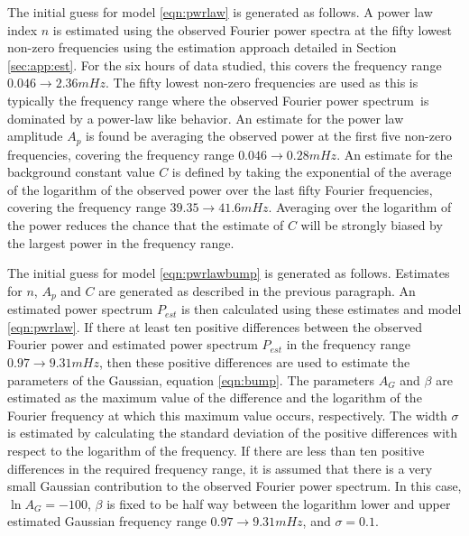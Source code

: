 \documentclass[onecolumn]{emulateapj}
\newcommand{\PS}{power spectrum}
\newcommand{\Fps}{Fourier \PS}
\begin{document}
The initial guess for model \ref{eqn:pwrlaw} is generated as follows.
A power law index $n$ is estimated using the observed Fourier power
spectra at the fifty lowest non-zero frequencies using the estimation
approach detailed in Section \ref{sec:app:est}.  For the six hours of
data studied, this covers the frequency range $0.046\rightarrow2.36
mHz$.  The fifty lowest non-zero frequencies are used as this is
typically the frequency range where the observed \Fps\ is dominated by
a power-law like behavior.  An estimate for the power law amplitude
$A_{p}$ is found be averaging the observed power at the first five
non-zero frequencies, covering the frequency range
$0.046\rightarrow0.28 mHz$.  An estimate for the background constant
value $C$ is defined by taking the exponential of the average of the
logarithm of the observed power over the last fifty Fourier
frequencies, covering the frequency range $39.35\rightarrow41.6 mHz$.
Averaging over the logarithm of the power reduces the chance that the
estimate of $C$ will be strongly biased by the largest power in the
frequency range.

The initial guess for model \ref{eqn:pwrlawbump} is generated as
follows.  Estimates for $n$, $A_{p}$ and $C$ are generated as
described in the previous paragraph.  An estimated power spectrum
$P_{est}$ is then calculated using these estimates and model
\ref{eqn:pwrlaw}.  If there at least ten positive differences between
the observed Fourier power and estimated power spectrum $P_{est}$ in
the frequency range $0.97 \rightarrow 9.31 mHz$, then these positive
differences are used to estimate the parameters of the Gaussian,
equation \ref{eqn:bump}.  The parameters $A_{G}$ and $\beta$ are
estimated as the maximum value of the difference and the logarithm of
the Fourier frequency at which this maximum value occurs,
respectively.  The width $\sigma$ is estimated by calculating the
standard deviation of the positive differences with respect to the
logarithm of the frequency.  If there are less than ten positive
differences in the required frequency range, it is assumed that there
is a very small Gaussian contribution to the observed \Fps.  In this
case, $\ln A_{G}=-100$, $\beta$ is fixed to be half way between the
logarithm lower and upper estimated Gaussian frequency range
$0.97 \rightarrow 9.31 mHz$, and $\sigma = 0.1$.
\end{document}
